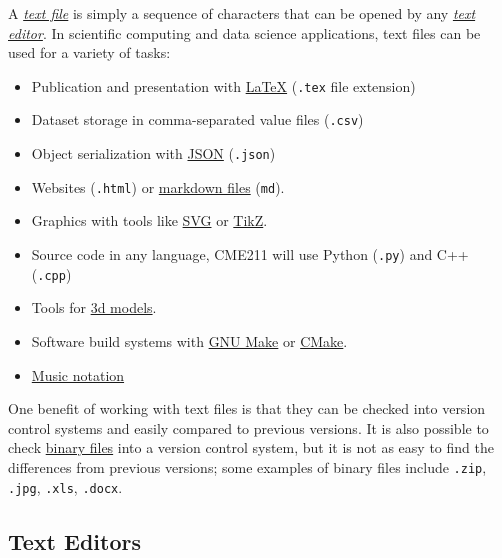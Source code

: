 \documentclass[12pt,letterpaper,twoside]{article}
\begin{document}
A \href{https://en.wikipedia.org/wiki/Text_file}{\emph{text file}}
is simply a sequence of characters that can be opened by any
\href{https://en.wikipedia.org/wiki/Text_editor}{\emph{text editor}}.  
In scientific computing and data science applications, text
files can be used for a variety of tasks:

\begin{multicols}{2}
\begin{itemize}
\item Publication and presentation with \href{https://www.latex-project.org/}{\LaTeX} (\texttt{.tex} file extension)
\item Dataset storage in comma-separated value files (\texttt{.csv})
\item Object serialization with \href{http://www.json.org/}{JSON} (\texttt{.json})
\item Websites (\texttt{.html}) or \href{http://daringfireball.net/projects/markdown/}{markdown files} (\texttt{md}).
\item Graphics with tools like \href{https://developer.mozilla.org/en-US/docs/Web/SVG}{SVG} or 
\href{http://www.texample.net/tikz/}{TikZ}.
\item Source code in any language, CME211 will use Python (\texttt{.py}) and C++ (\texttt{.cpp})
\item Tools for \href{http://www.implicitcad.org/}{3d models}.
\item Software build systems with \href{https://www.gnu.org/software/make/}{GNU Make} or \href{https://cmake.org/}{CMake}.
\item \href{http://lilypond.org/text-input.html}{Music notation}
\end{itemize}
\end{multicols}

One benefit of working with text files is that they can be checked into
version control systems and easily compared to previous versions.  It is also
possible to check \href{https://en.wikipedia.org/wiki/Binary_file}{binary files} 
into a version control system, but it is not as
easy to find the differences from previous versions;
some examples of binary files include
\texttt{.zip}, \texttt{.jpg}, \texttt{.xls}, \texttt{.docx}.

\vspace{-14pt}
\subsection{Text Editors}
\end{document}
